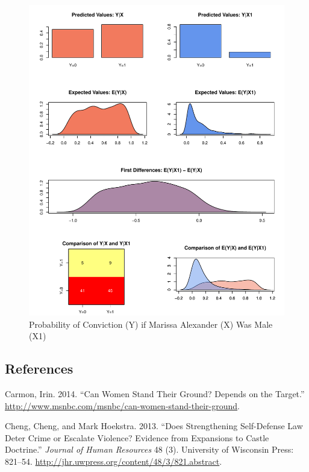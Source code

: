 \documentclass[12pt,article]{article}
\begin{document}
\begin{figure}[htbp]
\centering
\includegraphics{stand_your_ground_article_files/figure-latex/unnamed-chunk-9-1.pdf}
\caption{Probability of Conviction (Y) if Marissa Alexander (X) Was Male
(X1)}
\end{figure}

\pagebreak

\subsection*{References}\label{references}

Carmon, Irin. 2014. ``Can Women Stand Their Ground? Depends on the
Target.'' \url{http://www.msnbc.com/msnbc/can-women-stand-their-ground}.

Cheng, Cheng, and Mark Hoekstra. 2013. ``Does Strengthening Self-Defense
Law Deter Crime or Escalate Violence? Evidence from Expansions to Castle
Doctrine.'' \emph{Journal of Human Resources} 48 (3). University of
Wisconsin Press: 821--54.
\url{http://jhr.uwpress.org/content/48/3/821.abstract}.
\end{document}
